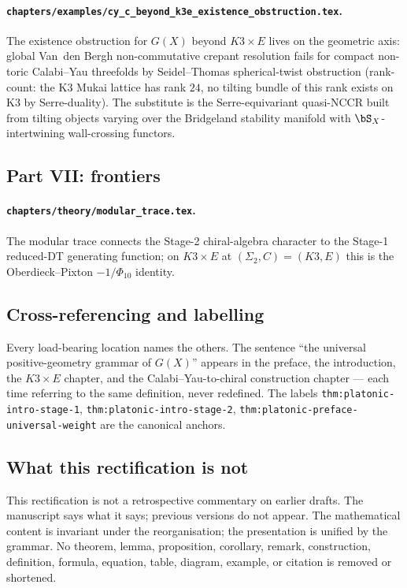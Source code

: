 \paragraph{\texttt{chapters/examples/cy\_c\_beyond\_k3e\_existence\_obstruction.tex}.}
The existence obstruction for $G(X)$ beyond $K3 \times E$ lives
on the geometric axis: global Van~den Bergh non-commutative crepant
resolution fails for compact non-toric Calabi--Yau threefolds by
Seidel--Thomas spherical-twist obstruction (rank-count: the K3
Mukai lattice has rank $24$, no tilting bundle of this rank
exists on K3 by Serre-duality). The substitute is the
Serre-equivariant quasi-NCCR built from tilting objects varying
over the Bridgeland stability manifold with $\bS_X$-intertwining
wall-crossing functors.

\subsection*{Part VII: frontiers}

\paragraph{\texttt{chapters/theory/modular\_trace.tex}.} The
modular trace connects the Stage-2 chiral-algebra character to
the Stage-1 reduced-DT generating function; on $K3 \times E$ at
$(\Sigma_2, C) = (K3, E)$ this is the
Oberdieck--Pixton $-1/\Phi_{10}$ identity.

\subsection*{Cross-referencing and labelling}

Every load-bearing location names the others. The sentence
``the universal positive-geometry grammar of $G(X)$'' appears
in the preface, the introduction, the $K3 \times E$ chapter, and
the Calabi--Yau-to-chiral construction chapter --- each time
referring to the same definition, never redefined. The labels
\texttt{thm:platonic-intro-stage-1},
\texttt{thm:platonic-intro-stage-2},
\texttt{thm:platonic-preface-universal-weight} are the canonical
anchors.

\subsection*{What this rectification is not}

This rectification is not a retrospective commentary on earlier
drafts. The manuscript says what it says; previous versions do
not appear. The mathematical content is invariant under the
reorganisation; the presentation is unified by the grammar.
No theorem, lemma, proposition, corollary, remark, construction,
definition, formula, equation, table, diagram, example, or
citation is removed or shortened.

